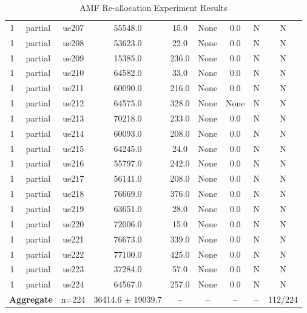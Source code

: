\begin{table}[ht]
\begin{tabular}{|c|c|c|c|c|c|c|c|c|}
1 & partial & ue207 & 55548.0 & 15.0 & None & 0.0 & N & N \\
1 & partial & ue208 & 53623.0 & 22.0 & None & 0.0 & N & N \\
1 & partial & ue209 & 15385.0 & 236.0 & None & 0.0 & N & N \\
1 & partial & ue210 & 64582.0 & 33.0 & None & 0.0 & N & N \\
1 & partial & ue211 & 60090.0 & 216.0 & None & 0.0 & N & N \\
1 & partial & ue212 & 64575.0 & 328.0 & None & None & N & N \\
1 & partial & ue213 & 70218.0 & 233.0 & None & 0.0 & N & N \\
1 & partial & ue214 & 60093.0 & 208.0 & None & 0.0 & N & N \\
1 & partial & ue215 & 64245.0 & 24.0 & None & 0.0 & N & N \\
1 & partial & ue216 & 55797.0 & 242.0 & None & 0.0 & N & N \\
1 & partial & ue217 & 56141.0 & 208.0 & None & 0.0 & N & N \\
1 & partial & ue218 & 76669.0 & 376.0 & None & 0.0 & N & N \\
1 & partial & ue219 & 63651.0 & 28.0 & None & 0.0 & N & N \\
1 & partial & ue220 & 72006.0 & 15.0 & None & 0.0 & N & N \\
1 & partial & ue221 & 76673.0 & 339.0 & None & 0.0 & N & N \\
1 & partial & ue222 & 77100.0 & 425.0 & None & 0.0 & N & N \\
1 & partial & ue223 & 37284.0 & 57.0 & None & 0.0 & N & N \\
1 & partial & ue224 & 64567.0 & 257.0 & None & 0.0 & N & N \\
\multicolumn{2}{|c|}{\textbf{Aggregate}} & n=224 & 36414.6 $\pm$ 19039.7 & -- & -- & -- & -- & 112/224 \\
\hline
\end{tabular}
\caption{AMF Re-allocation Experiment Results}
\label{tab:amf_realloc}
\end{table}
